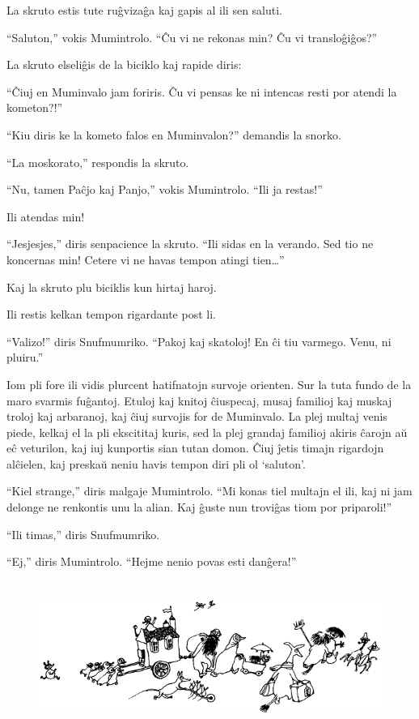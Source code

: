 La skruto estis tute ruĝvizaĝa kaj gapis al ili sen saluti.

``Saluton,'' vokis Mumintrolo. ``Ĉu vi ne rekonas min? Ĉu vi transloĝiĝos?''

La skruto elseliĝis de la biciklo kaj rapide diris:

``Ĉiuj en Muminvalo jam foriris. Ĉu vi pensas ke ni intencas resti por atendi la kometon?!''

``Kiu diris ke la kometo falos en Muminvalon?'' demandis la snorko.

``La moskorato,'' respondis la skruto.

``Nu, tamen Paĉjo kaj Panjo,'' vokis Mumintrolo. ``Ili ja restas!''

Ili atendas min!

``Jesjesjes,'' diris senpacience la skruto. ``Ili sidas en la verando. Sed tio ne koncernas min! Cetere vi ne havas tempon atingi tien{\ldots}''

Kaj la skruto plu biciklis kun hirtaj haroj.

Ili restis kelkan tempon rigardante post li.

``Valizo!'' diris Snufmumriko. ``Pakoj kaj skatoloj! En ĉi tiu varmego. Venu, ni pluiru.''

Iom pli fore ili vidis plurcent hatifnatojn survoje orienten. Sur la tuta fundo de la maro svarmis fuĝantoj. Etuloj kaj knitoj ĉiuspecaj, musaj familioj kaj muskaj troloj kaj arbaranoj, kaj ĉiuj survojis for de Muminvalo. La plej multaj venis piede, kelkaj el la pli ekscititaj kuris, sed la plej grandaj familioj akiris ĉarojn aŭ eĉ veturilon, kaj iuj kunportis sian tutan domon. Ĉiuj ĵetis timajn rigardojn alĉielen, kaj preskaŭ neniu havis tempon diri pli ol `saluton'.

``Kiel strange,'' diris malgaje Mumintrolo. ``Mi konas tiel multajn el ili, kaj ni jam delonge ne renkontis unu la alian. Kaj ĝuste nun troviĝas tiom por priparoli!''

``Ili timas,'' diris Snufmumriko.

``Ej,'' diris Mumintrolo. ``Hejme nenio povas esti danĝera!''

\begin{figure}[htbp]
\centering
\includegraphics[width=417pt,height=138pt]{8-2.png}
\caption{}
\label{8-2}
\end{figure}


